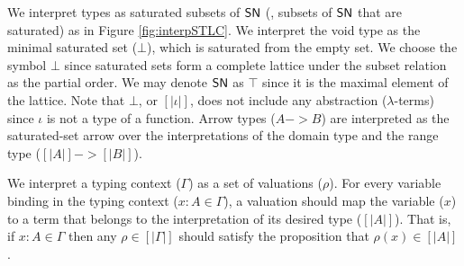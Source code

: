We interpret types as saturated subsets of $\mathsf{SN}$ (\ie, subsets of $\mathsf{SN}$ that
are saturated) as in Figure \ref{fig:interpSTLC}. We interpret the void type as
the minimal saturated set ($\bot$), which is saturated from the empty set.
We choose the symbol $\bot$ since saturated sets form a complete lattice
under the subset relation as the partial order. We may denote $\mathsf{SN}$ as $\top$
since it is the maximal element of the lattice. Note that $\bot$,
or $[|\iota|]$, does not include any abstraction ($\lambda$-terms)
since $\iota$ is not a type of a function. Arrow types ($A -> B$) are
interpreted as the saturated-set arrow over the interpretations of
the domain type and the range type ($[|A|] -> [|B|]$).

We interpret a typing context ($\Gamma$) as a set of valuations ($\rho$).
For every variable binding in the typing context ($x:A \in \Gamma$),
a valuation should map the variable ($x$) to a term that belongs to
the interpretation of its desired type ($[|A|]$). That is,
if $x : A \in \Gamma$ then any $\rho \in [|\Gamma|]$ should
satisfy the proposition that $\rho(x) \in [|A|]$.

